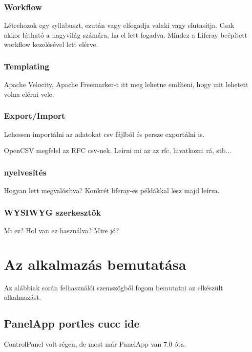 \documentclass[hidelinks, 12pt, a4paper]{report}
\begin{document}
\subsection{Workflow}

Létrehozok egy syllabuszt, ezután vagy elfogadja valaki vagy elutasítja. Csak akkor látható a nagyvilág számára, ha el lett fogadva. Mindez a Liferay beépített workflow kezelésével lett elérve.

\subsection{Templating}

Apache Velocity, Apache Freemarker-t itt meg lehetne említeni, hogy mit lehetett volna elérni vele.

\subsection{Export/Import}

Lehessen importálni az adatokat csv fájlból és persze exportálni is.

OpenCSV megfelel az RFC csv-nek. Leírni mi az az rfc, hivatkozni rá, stb...

\subsection{nyelvesítés}

Hogyan lett megvalósítva? Konkrét liferay-es példákkal lesz majd leírva.

\subsection{WYSIWYG szerkesztők}

Mi ez? Hol van ez használva? Mire jó?

\chapter{Az alkalmazás bemutatása}

Az alábbiak során felhasználói szemszögből fogom bemutatni az elkészült alkalmazást.

\section{PanelApp portles cucc ide}

ControlPanel volt régen, de most már PanelApp van 7.0 óta.
\end{document}
